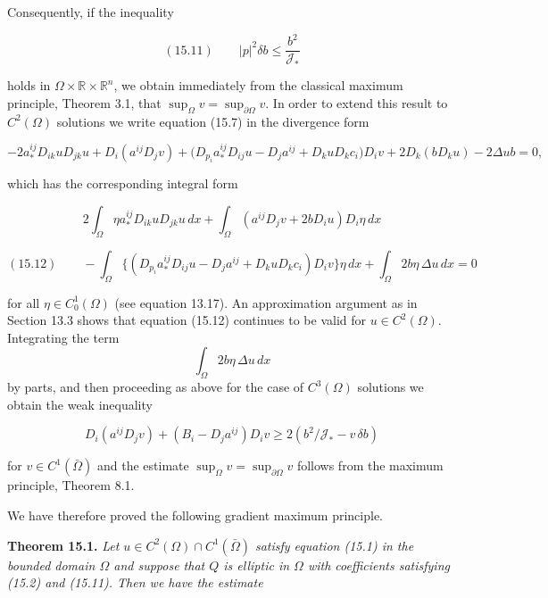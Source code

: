 Consequently, if the inequality

\begin{equation}
(15.11)\qquad |p|^2\delta b\le \frac{b^2}{\mathcal{J}_*}
\end{equation}

holds in $\Omega\times \mathbb{R}\times \mathbb{R}^n$, we obtain immediately from the classical maximum principle, Theorem 3.1, that $\sup_\Omega v=\sup_{\partial\Omega}v$. In order to extend this result to $C^2(\Omega)$ solutions we write equation (15.7) in the divergence form

\begin{equation*}
-2a_*^{ij}D_{ik}uD_{jk}u+D_i(a^{ij}D_jv)+\bigl(D_{p_i}a_*^{ij}D_{ij}u-D_ja^{ij}+D_kuD_kc_i\bigr)D_iv
+2D_k(bD_ku)-2\Delta ub=0,
\end{equation*}

which has the corresponding integral form

\begin{equation*}
2\int_\Omega \eta a_*^{ij}D_{ik}uD_{jk}u\,dx+\int_\Omega (a^{ij}D_jv+2bD_iu)D_i\eta\,dx
\end{equation*}

\begin{equation}
(15.12)\qquad -\int_\Omega \bigl\{(D_{p_i}a_*^{ij}D_{ij}u-D_ja^{ij}+D_kuD_kc_i)D_iv\bigr\}\eta\,dx
+\int_\Omega 2b\eta\,\Delta u\,dx=0
\end{equation}



for all $\eta \in C_0^1(\Omega)$ (see equation 13.17). An approximation argument as in Section
13.3 shows that equation (15.12) continues to be valid for $u \in C^2(\Omega)$. Integrating
the term
\[
\int_\Omega 2b\eta\,\Delta u\,dx
\]
by parts, and then proceeding as above for the case of $C^3(\Omega)$
solutions we obtain the weak inequality

\begin{equation}
\tag{15.13}
D_i(a^{ij}D_j v)+(B_i-D_ja^{ij})D_iv \ge 2(b^2/\mathcal{J}_* - v\,\delta b)
\end{equation}

for $v \in C^1(\bar{\Omega})$ and the estimate $\sup_\Omega v = \sup_{\partial\Omega} v$ follows from the maximum principle,
Theorem 8.1.

We have therefore proved the following gradient maximum principle.

\medskip

\noindent\textbf{Theorem 15.1.} \textit{Let $u \in C^2(\Omega) \cap C^1(\bar{\Omega})$ satisfy equation (15.1) in the bounded
domain $\Omega$ and suppose that $Q$ is elliptic in $\Omega$ with coefficients satisfying (15.2) and
(15.11). Then we have the estimate}

